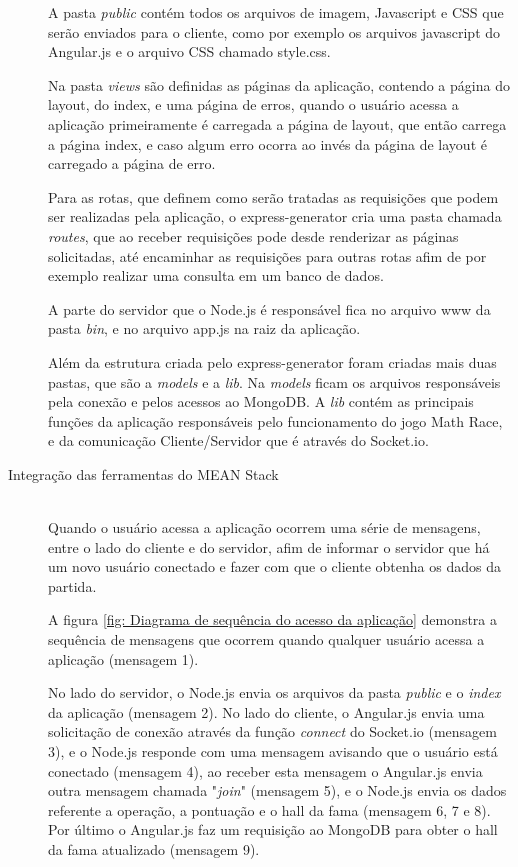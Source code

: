 \begin{description}
A pasta \textit{public} contém todos os arquivos de imagem, Javascript e CSS que serão enviados para o cliente, como por exemplo os arquivos javascript do Angular.js e o arquivo CSS chamado style.css.

Na pasta \textit{views} são definidas as páginas da aplicação, contendo a página do layout, do index, e uma página de erros, quando o usuário acessa a aplicação primeiramente é carregada a página de layout, que então carrega a página index, e caso algum erro ocorra ao invés da página de layout é carregado a página de erro.

Para as rotas, que definem como serão tratadas as requisições que podem ser realizadas pela aplicação, o express-generator cria uma pasta chamada \textit{routes}, que ao receber requisições pode desde renderizar as páginas solicitadas, até encaminhar as requisições para outras rotas afim de por exemplo realizar uma consulta em um banco de dados.

A parte do servidor que o Node.js é responsável fica no arquivo www da pasta \textit{bin}, e no arquivo app.js na raiz da aplicação.  

Além da estrutura criada pelo express-generator foram criadas mais duas pastas, que são a \textit{models} e a \textit{lib}. Na \textit{models} ficam os arquivos responsáveis pela conexão e pelos acessos ao MongoDB. A \textit{lib} contém as principais funções da aplicação responsáveis pelo funcionamento do jogo Math Race, e da comunicação Cliente/Servidor que é através do Socket.io.

\item[Integração das ferramentas do MEAN Stack] \hfill \\
Quando o usuário acessa a aplicação ocorrem uma série de mensagens, entre o lado do cliente e do servidor, afim de informar o servidor que há um novo usuário conectado e fazer com que o cliente obtenha os dados da partida. 

A figura \ref{fig: Diagrama de sequência do acesso da aplicação} demonstra a sequência de mensagens que ocorrem quando qualquer usuário acessa a aplicação (mensagem 1). 

No lado do servidor, o Node.js envia os arquivos da pasta \textit{public} e o \textit{index} da aplicação (mensagem 2). No lado do cliente, o Angular.js envia uma solicitação de conexão através da função \textit{connect} do Socket.io (mensagem 3), e o Node.js responde com uma mensagem avisando que o usuário está conectado (mensagem 4), ao receber esta mensagem o Angular.js envia outra mensagem chamada "\textit{join}" (mensagem 5), e o Node.js envia os dados referente a operação, a pontuação e o hall da fama (mensagem 6, 7 e 8). Por último o Angular.js faz um requisição ao MongoDB para obter o hall da fama atualizado (mensagem 9). 


\end{description}
